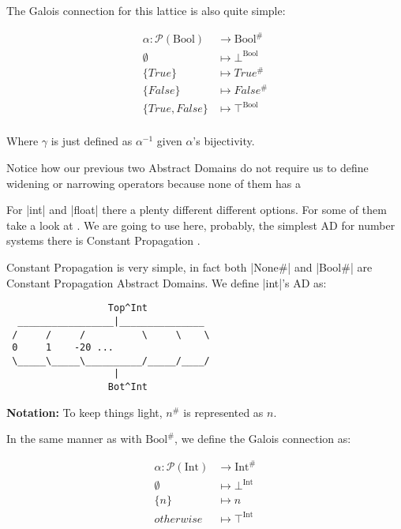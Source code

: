 The Galois connection for this lattice is also quite simple:

\begin{align*}
  \alpha \colon \mathcal{P}(\text{Bool}) &\to \text{Bool}^{\#} \\
  \emptyset &\mapsto \bot^{\text{Bool}} \\
  \{True\} &\mapsto True^{\#} \\
  \{False\} &\mapsto False^{\#} \\
  \{True,False\} &\mapsto \top^{\text{Bool}} \\
\end{align*}

Where \(\gamma{}\) is just defined as \(\alpha^{-1}\) given
\(\alpha{}\)'s bijectivity.

Notice how our previous two Abstract Domains do not require us to define
widening or narrowing operators because none of them has a

For \pycode|int| and \pycode|float| there a plenty different different
options. For some of them take a look at {}. We are going to use here, probably, the simplest AD for number
systems there is Constant Propagation {}.

Constant Propagation is very simple, in fact both \pycode|None#| and
\pycode|Bool#| are Constant Propagation Abstract Domains. We define
\pycode|int|'s AD as:

{}

\begin{verbatim}
                  Top^Int
  _________________|_______________
 /     /     /          \     \    \
 0     1    -20 ...
 \_____\_____\__________/_____/____/
                   |
                  Bot^Int
\end{verbatim}

\textbf{Notation:} To keep things light, \(n^{\#}\) is represented as
\(n\).

In the same manner as with \(\text{Bool}^{\#}\), we define the Galois
connection as:

\begin{align*}
  \alpha \colon \mathcal{P}(\text{Int}) &\to \text{Int}^{\#} \\
  \emptyset &\mapsto \bot^{\text{Int}} \\
  \{n\} &\mapsto n \\
  otherwise &\mapsto \top^{\text{Int}} \\
\end{align*}

